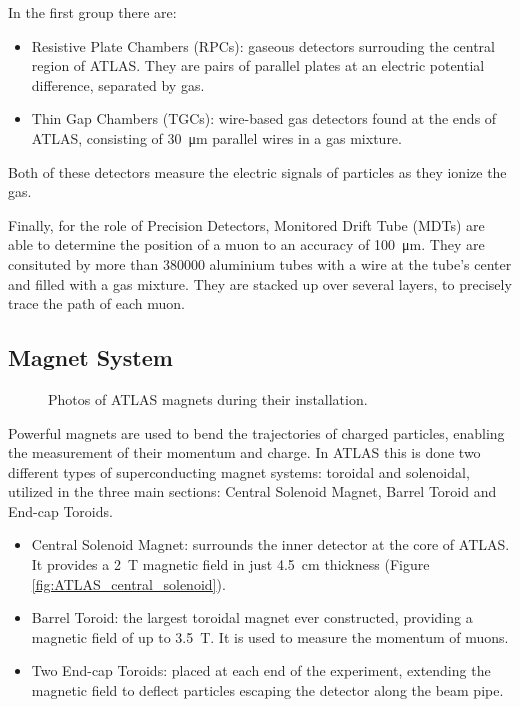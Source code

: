 In the first group there are: 
\begin{itemize}
    \item Resistive Plate Chambers (RPCs): gaseous detectors surrouding the central region of ATLAS. They are pairs of parallel plates at an electric potential difference, separated by gas.
    \item Thin Gap Chambers (TGCs): wire-based gas detectors found at the ends of ATLAS, consisting of \qty{30}{\micro\meter} parallel wires in a gas mixture.
\end{itemize}
Both of these detectors measure the electric signals of particles as they ionize the gas.

Finally, for the role of Precision Detectors, Monitored Drift Tube (MDTs) are able to determine the position of a muon to an accuracy of \qty{100}{\micro\meter}. They are consituted by more than \num{380000} aluminium tubes with a wire at the tube's center and filled with a gas mixture. They are stacked up over several layers, to precisely trace the path of each muon.


\subsection{Magnet System}\label{sec:magnet_system}

\begin{figure}[!ht]
    \centering
    \hfill
    \centering
    \caption{Photos of ATLAS magnets during their installation.}
\end{figure}

Powerful magnets are used to bend the trajectories of charged particles, enabling the measurement of their momentum and charge. In ATLAS this is done two different types of superconducting magnet systems: toroidal and solenoidal, utilized in the three main sections: Central Solenoid Magnet, Barrel Toroid and End-cap Toroids.
\begin{itemize}
    \item Central Solenoid Magnet: surrounds the inner detector at the core of ATLAS. It provides a \qty{2}{\tesla} magnetic field in just \qty{4.5}{\centi\meter} thickness (Figure \ref{fig:ATLAS_central_solenoid}).
    \item Barrel Toroid: the largest toroidal magnet ever constructed, providing a magnetic field of up to \qty{3.5}{\tesla}. It is used to measure the momentum of muons.
    \item Two End-cap Toroids: placed at each end of the experiment, extending the magnetic field to deflect particles escaping the detector along the beam pipe.
\end{itemize}

